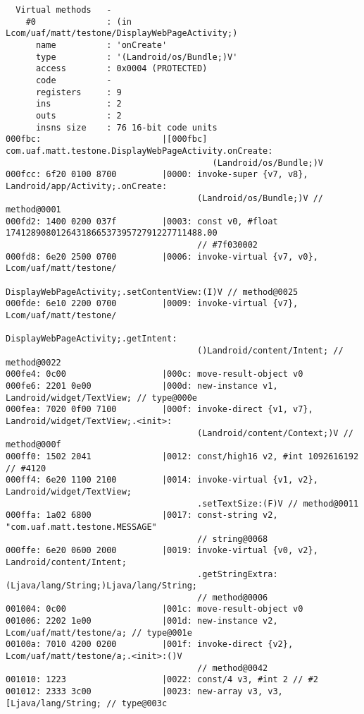 \begin{lstlisting}
  Virtual methods   -
    #0              : (in Lcom/uaf/matt/testone/DisplayWebPageActivity;)
      name          : 'onCreate'
      type          : '(Landroid/os/Bundle;)V'
      access        : 0x0004 (PROTECTED)
      code          -
      registers     : 9
      ins           : 2
      outs          : 2
      insns size    : 76 16-bit code units
000fbc:                        |[000fbc] com.uaf.matt.testone.DisplayWebPageActivity.onCreate:
                                         (Landroid/os/Bundle;)V
000fcc: 6f20 0100 8700         |0000: invoke-super {v7, v8}, Landroid/app/Activity;.onCreate:
                                      (Landroid/os/Bundle;)V // method@0001
000fd2: 1400 0200 037f         |0003: const v0, #float 174128908012643186653739572791227711488.00
                                      // #7f030002
000fd8: 6e20 2500 0700         |0006: invoke-virtual {v7, v0}, Lcom/uaf/matt/testone/
                                      DisplayWebPageActivity;.setContentView:(I)V // method@0025
000fde: 6e10 2200 0700         |0009: invoke-virtual {v7}, Lcom/uaf/matt/testone/
                                      DisplayWebPageActivity;.getIntent:
                                      ()Landroid/content/Intent; // method@0022
000fe4: 0c00                   |000c: move-result-object v0
000fe6: 2201 0e00              |000d: new-instance v1, Landroid/widget/TextView; // type@000e
000fea: 7020 0f00 7100         |000f: invoke-direct {v1, v7}, Landroid/widget/TextView;.<init>:
                                      (Landroid/content/Context;)V // method@000f
000ff0: 1502 2041              |0012: const/high16 v2, #int 1092616192 // #4120
000ff4: 6e20 1100 2100         |0014: invoke-virtual {v1, v2}, Landroid/widget/TextView;
                                      .setTextSize:(F)V // method@0011
000ffa: 1a02 6800              |0017: const-string v2, "com.uaf.matt.testone.MESSAGE"
                                      // string@0068
000ffe: 6e20 0600 2000         |0019: invoke-virtual {v0, v2}, Landroid/content/Intent;
                                      .getStringExtra:(Ljava/lang/String;)Ljava/lang/String;
                                      // method@0006
001004: 0c00                   |001c: move-result-object v0
001006: 2202 1e00              |001d: new-instance v2, Lcom/uaf/matt/testone/a; // type@001e
00100a: 7010 4200 0200         |001f: invoke-direct {v2}, Lcom/uaf/matt/testone/a;.<init>:()V
                                      // method@0042
001010: 1223                   |0022: const/4 v3, #int 2 // #2
001012: 2333 3c00              |0023: new-array v3, v3, [Ljava/lang/String; // type@003c

\end{lstlisting}
